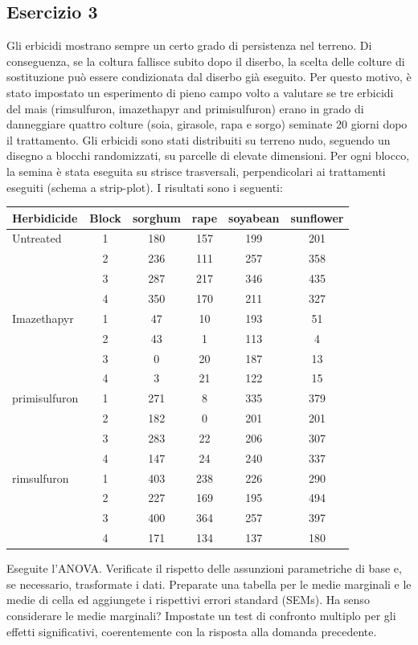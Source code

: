 \documentclass[a4paper,12pt,oneside]{book}
\begin{document}
\hypertarget{esercizio-3-7}{%
\subsection{Esercizio 3}\label{esercizio-3-7}}

Gli erbicidi mostrano sempre un certo grado di persistenza nel terreno. Di conseguenza, se la coltura fallisce subito dopo il diserbo, la scelta delle colture di sostituzione può essere condizionata dal diserbo già eseguito. Per questo motivo, è stato impostato un esperimento di pieno campo volto a valutare se tre erbicidi del mais (rimsulfuron, imazethapyr and primisulfuron) erano in grado di danneggiare quattro colture (soia, girasole, rapa e sorgo) seminate 20 giorni dopo il trattamento. Gli erbicidi sono stati distribuiti su terreno nudo, seguendo un disegno a blocchi randomizzati, su parcelle di elevate dimensioni. Per ogni blocco, la semina è stata eseguita su strisce trasversali, perpendicolari ai trattamenti eseguiti (schema a strip-plot). I risultati sono i seguenti:

\begin{longtable}[]{@{}lccccc@{}}
\toprule
Herbidicide & Block & sorghum & rape & soyabean & sunflower \\
\midrule
\endhead
Untreated & 1 & 180 & 157 & 199 & 201 \\
& 2 & 236 & 111 & 257 & 358 \\
& 3 & 287 & 217 & 346 & 435 \\
& 4 & 350 & 170 & 211 & 327 \\
Imazethapyr & 1 & 47 & 10 & 193 & 51 \\
& 2 & 43 & 1 & 113 & 4 \\
& 3 & 0 & 20 & 187 & 13 \\
& 4 & 3 & 21 & 122 & 15 \\
primisulfuron & 1 & 271 & 8 & 335 & 379 \\
& 2 & 182 & 0 & 201 & 201 \\
& 3 & 283 & 22 & 206 & 307 \\
& 4 & 147 & 24 & 240 & 337 \\
rimsulfuron & 1 & 403 & 238 & 226 & 290 \\
& 2 & 227 & 169 & 195 & 494 \\
& 3 & 400 & 364 & 257 & 397 \\
& 4 & 171 & 134 & 137 & 180 \\
\bottomrule
\end{longtable}

Eseguite l'ANOVA. Verificate il rispetto delle assunzioni parametriche di base e, se necessario, trasformate i dati. Preparate una tabella per le medie marginali e le medie di cella ed aggiungete i rispettivi errori standard (SEMs). Ha senso considerare le medie marginali? Impostate un test di confronto multiplo per gli effetti significativi, coerentemente con la risposta alla domanda precedente.
\end{document}
